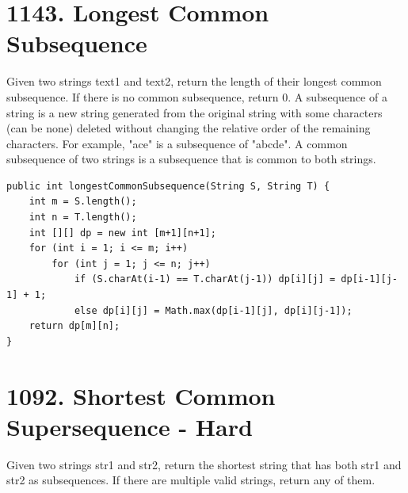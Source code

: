 \documentclass[9pt, b5paaper]{book}
\begin{document}
\section{1143. Longest Common Subsequence}
\label{sec-2-30}
Given two strings text1 and text2, return the length of their longest common subsequence. If there is no common subsequence, return 0.
A subsequence of a string is a new string generated from the original string with some characters (can be none) deleted without changing the relative order of the remaining characters.
For example, "ace" is a subsequence of "abcde".
A common subsequence of two strings is a subsequence that is common to both strings.
\begin{verbatim}
public int longestCommonSubsequence(String S, String T) {
    int m = S.length();
    int n = T.length();
    int [][] dp = new int [m+1][n+1];
    for (int i = 1; i <= m; i++) 
        for (int j = 1; j <= n; j++) 
            if (S.charAt(i-1) == T.charAt(j-1)) dp[i][j] = dp[i-1][j-1] + 1;
            else dp[i][j] = Math.max(dp[i-1][j], dp[i][j-1]);
    return dp[m][n];
}
\end{verbatim}

\section{1092. Shortest Common Supersequence - Hard}
\label{sec-2-31}
Given two strings str1 and str2, return the shortest string that has both str1 and str2 as subsequences. If there are multiple valid strings, return any of them.
\end{document}
